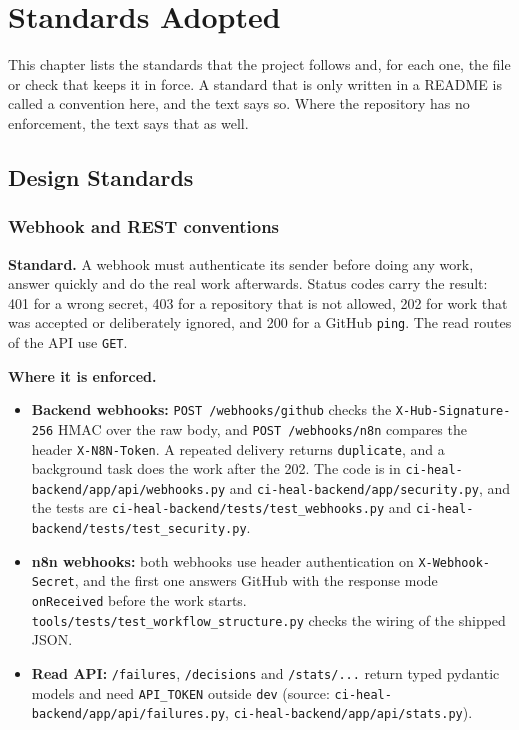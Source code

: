 \chapter{Standards Adopted}

This chapter lists the standards that the project follows and, for each one, the file or check that keeps it in force. A standard that is only written in a README is called a convention here, and the text says so. Where the repository has no enforcement, the text says that as well.

\section{Design Standards}

\subsection{Webhook and REST conventions}

\textbf{Standard.} A webhook must authenticate its sender before doing any work, answer quickly and do the real work afterwards. Status codes carry the result: 401 for a wrong secret, 403 for a repository that is not allowed, 202 for work that was accepted or deliberately ignored, and 200 for a GitHub \texttt{ping}. The read routes of the API use \texttt{GET}.

\textbf{Where it is enforced.}
\begin{itemize}
  \item \textbf{Backend webhooks:} \texttt{POST /webhooks/github} checks the \texttt{X-Hub-Signature-256} HMAC over the raw body, and \texttt{POST /webhooks/n8n} compares the header \texttt{X-N8N-Token}. A repeated delivery returns \texttt{duplicate}, and a background task does the work after the 202. The code is in \texttt{ci-heal-backend/\allowbreak{}app/\allowbreak{}api/\allowbreak{}webhooks.py} and \texttt{ci-heal-backend/\allowbreak{}app/\allowbreak{}security.py}, and the tests are \texttt{ci-heal-backend/\allowbreak{}tests/\allowbreak{}test\_\allowbreak{}webhooks.py} and \texttt{ci-heal-backend/\allowbreak{}tests/\allowbreak{}test\_\allowbreak{}security.py}.
  \item \textbf{n8n webhooks:} both webhooks use header authentication on \texttt{X-Webhook-Secret}, and the first one answers GitHub with the response mode \texttt{onReceived} before the work starts. \texttt{tools/\allowbreak{}tests/\allowbreak{}test\_\allowbreak{}workflow\_\allowbreak{}structure.py} checks the wiring of the shipped JSON.
  \item \textbf{Read API:} \texttt{/failures}, \texttt{/decisions} and \texttt{/stats/...} return typed pydantic models and need \texttt{API\_TOKEN} outside \texttt{dev} (source: \texttt{ci-heal-backend/\allowbreak{}app/\allowbreak{}api/\allowbreak{}failures.py}, \texttt{ci-heal-backend/\allowbreak{}app/\allowbreak{}api/\allowbreak{}stats.py}).
\end{itemize}

